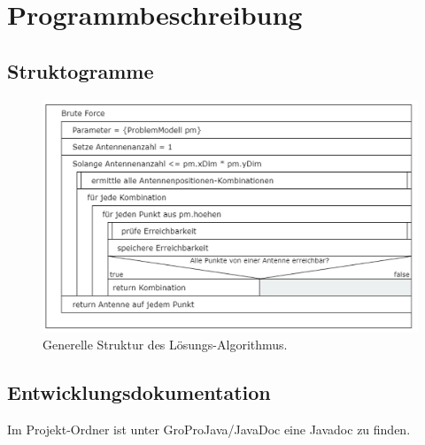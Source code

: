 \chapter{Programmbeschreibung}\label{ch:programmbeschreibung}

\section{Struktogramme}\label{sec:pap}

\begin{figure}[htb]
    \centering
    \includegraphics[width=\linewidth]{images/Struktogram}
    \caption{
        Generelle Struktur des Lösungs-Algorithmus.
    }
    \label{fig:github}
\end{figure}

\section{Entwicklungsdokumentation}\label{sec:entwicklerdokumentation}
Im Projekt-Ordner ist unter GroProJava/JavaDoc eine Javadoc zu finden.